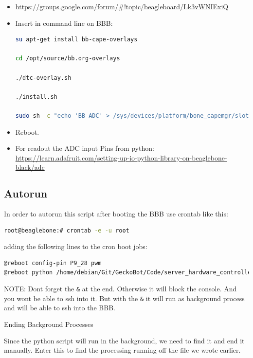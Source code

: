 \documentclass[
	fontsize=10pt
	paper=a4
]{scrartcl}
\begin{document}
\begin{itemize}

\item \url{https://groups.google.com/forum/#!topic/beagleboard/Lk3vWNIExiQ}

\item Insert in command line on BBB:

\begin{lstlisting}[language=bash]
su apt-get install bb-cape-overlays

cd /opt/source/bb.org-overlays

./dtc-overlay.sh

./install.sh

sudo sh -c "echo 'BB-ADC' > /sys/devices/platform/bone_capemgr/slots"
\end{lstlisting}


\item Reboot.

\item For readout the ADC input Pins from python: \url{https://learn.adafruit.com/setting-up-io-python-library-on-beaglebone-black/adc}


\end{itemize}


\subsection{Autorun}

In order to autorun this script after booting the BBB use crontab like this:

\begin{lstlisting}[language=bash]
root@beaglebone:# crontab -e -u root
\end{lstlisting}

adding the following lines to the cron boot jobs:
\begin{lstlisting}[language=bash]
@reboot config-pin P9_28 pwm
@reboot python /home/debian/Git/GeckoBot/Code/server_hardware_controlled.py &
\end{lstlisting}

NOTE: Dont forget the \texttt{\&} at the end. Otherwise it will block the console.
And you wont be able to ssh into it.
But with the \texttt{\&} it will run as background process and will be able to ssh into
the BBB.

Ending Background Processes

Since the python script will run in the background, we need to find it and
end it manually. Enter this to find the processing running off the file we
wrote earlier.
\end{document}
